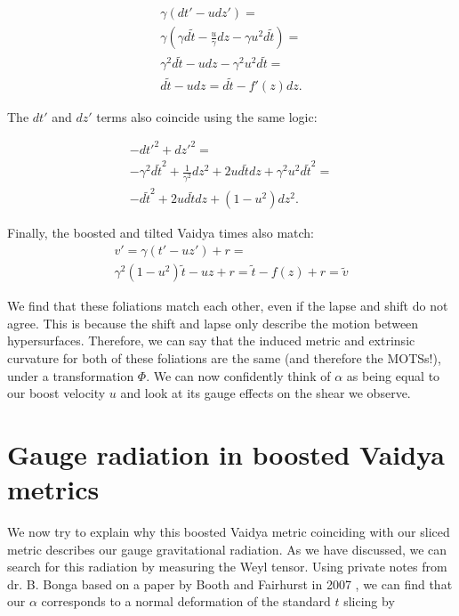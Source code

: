 \documentclass[twoside, openright]{RadboudReport}
\begin{document}
\begin{equation}
	\begin{split}
		\gamma(dt' -udz') = \\
		\gamma(\gamma d\tilde{t} - \frac{u}{\gamma}dz - \gamma u^2d\tilde{t}) =\\
		\gamma^2d\tilde{t} - udz - \gamma^2 u^2 d\tilde{t} =\\
		d\tilde{t} - udz = d\tilde{t} - f'(z)dz.
	\end{split}
\end{equation}

The $dt'$ and $dz'$ terms also coincide using the same logic:

\begin{equation}
	\begin{split}
		-dt'^2+dz'^2 =\\
		-\gamma^2d\tilde{t}^2+\frac{1}{\gamma^2}dz^2 + 2ud\tilde{t}dz + \gamma^2 u^2d\tilde{t}^2=\\
		-d\tilde{t}^2 + 2ud\tilde{t}dz + (1-u^2)dz^2.
	\end{split}
\end{equation}

Finally, the boosted and tilted Vaidya times also match:
\begin{equation}
	\begin{split}
		v' = \gamma(t'- uz')+r =\\
		\gamma^2(1-u^2)\tilde{t}-uz+r = \tilde{t} - f(z)+r =\tilde{v}
	\end{split}
\end{equation}

We find that these foliations match each other, even if the lapse and shift do not agree. This is because the shift and lapse only describe the motion between hypersurfaces. Therefore, we can say that the induced metric and extrinsic curvature for both of these foliations are the same (and therefore the MOTSs!), under a transformation $\Phi$. We can now confidently think of $\alpha$ as being equal to our boost velocity $u$ and look at its gauge effects on the shear we observe.

\section{Gauge radiation in boosted Vaidya metrics}

We now try to explain why this boosted Vaidya metric coinciding with our sliced metric describes our gauge gravitational radiation. As we have discussed, we can search for this radiation by measuring the Weyl tensor. Using private notes from dr. B. Bonga based on a paper by Booth and Fairhurst in 2007 \cite{Booth_2007},  we can find that our $\alpha$ corresponds to a normal deformation of the standard $t$ slicing by
\end{document}
